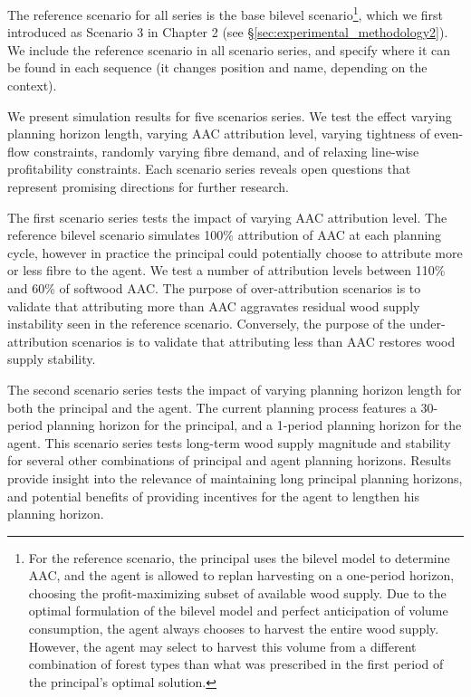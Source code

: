 The reference scenario for all series is the base bilevel scenario\footnote{For the reference scenario, the principal uses the bilevel model to determine AAC, and the agent is allowed to replan harvesting on a one-period horizon, choosing the profit-maximizing subset of available wood supply. Due to the optimal formulation of the bilevel model and perfect anticipation of volume consumption, the agent always chooses to harvest the entire wood supply. However, the agent may select to harvest this volume from a different combination of forest types than what was prescribed in the first period of the principal’s optimal solution.}, which we first introduced as Scenario 3 in Chapter 2 (see \S\ref{sec:experimental_methodology2}). We include the reference scenario in all scenario series, and specify where it can be found in each sequence (it changes position and name, depending on the context).  

We present simulation results for five scenarios series. We test the effect varying planning horizon length, varying AAC attribution level, varying tightness of even-flow constraints, randomly varying fibre demand, and of relaxing line-wise profitability constraints. Each scenario series reveals open questions that represent promising directions for further research.

The first scenario series tests the impact of varying AAC attribution level. The reference bilevel scenario simulates 100\% attribution of AAC at each planning cycle, however in practice the principal could potentially choose to attribute more or less fibre to the agent. We test a number of attribution levels between 110\% and 60\% of softwood AAC. The purpose of over-attribution scenarios is to validate that attributing more than AAC aggravates residual wood supply instability seen in the reference scenario. Conversely, the purpose of the under-attribution scenarios is to validate that attributing less than AAC restores wood supply stability.

The second scenario series tests the impact of varying planning horizon length for both the principal and the agent. The current planning process features a 30-period planning horizon for the principal, and a 1-period planning horizon for the agent. This scenario series tests long-term wood supply magnitude and stability for several other combinations of principal and agent planning horizons. Results provide insight into the relevance of maintaining long principal planning horizons, and potential benefits of providing incentives for the agent to lengthen his planning horizon.

